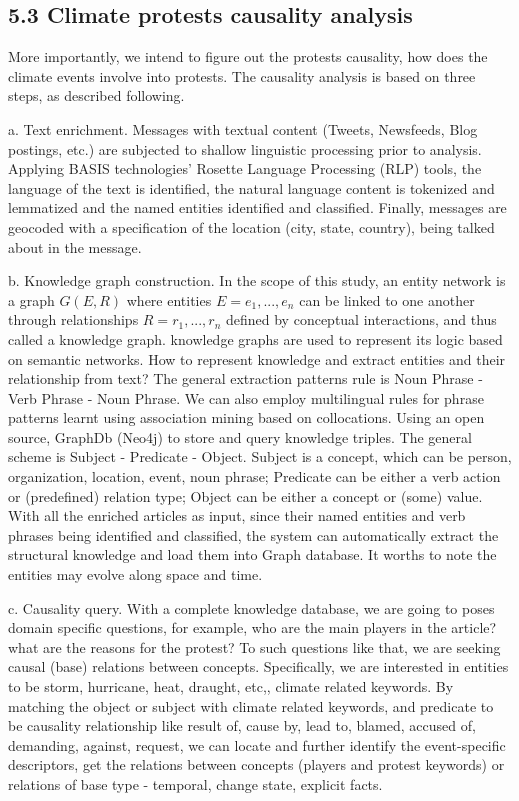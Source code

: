 \documentclass[9pt,twocolumn,twoside]{pnas-new}
\begin{document}
\subsection*{5.3 Climate protests causality analysis}
More importantly, we intend to figure out the protests causality, how does the climate events involve into protests. The causality analysis is based on three steps, as described following.

a. Text enrichment.
Messages with textual content (Tweets, Newsfeeds, Blog postings, etc.) are subjected to shallow linguistic processing prior to analysis. Applying BASIS technologies' Rosette Language Processing (RLP) tools, the language of the text is identified, the natural language content is tokenized and lemmatized and the named entities identified and classified. Finally, messages are geocoded with a specification of the location (city, state, country), being talked about in the message.

b. Knowledge graph construction.
In the scope of this study, an entity network is a graph $G(E, R)$ where entities $E = {e_1,
. . ., e_n}$ can be linked to one another through relationships $R = {r_1, . . ., r_n}$ defined by conceptual interactions, and thus called a knowledge graph. knowledge graphs are used to represent its logic based on semantic networks.
How to represent knowledge and extract entities and their relationship from text?
The general extraction patterns rule is Noun Phrase - Verb Phrase - Noun Phrase. We can also employ multilingual rules for phrase patterns learnt using association mining based on collocations. Using an open source, GraphDb (Neo4j) to store and query knowledge triples.
The general scheme is Subject - Predicate - Object. Subject is a concept, which can be person, organization, location, event, noun phrase; Predicate can be either a verb action or (predefined) relation type; Object can be either a concept or (some) value. With all the enriched articles as input, since their named entities and verb phrases being identified and classified, the system can automatically extract the structural knowledge and load them into Graph database. It worths to note the entities may evolve along space and time.

c. Causality query.
With a complete knowledge database, we are going to poses domain specific questions, for example, who are the main players in the article? what are the reasons for the protest? To such questions like that, we are seeking causal (base) relations between concepts. Specifically, we are interested in entities to be storm, hurricane, heat, draught, etc,, climate related keywords. By matching the object or subject with climate related keywords, and predicate to be causality relationship like result of, cause by, lead to, blamed, accused of, demanding, against, request, we can locate and further identify the event-specific descriptors, get the relations between concepts (players and protest keywords) or relations of base type - temporal, change state, explicit facts.
\end{document}
